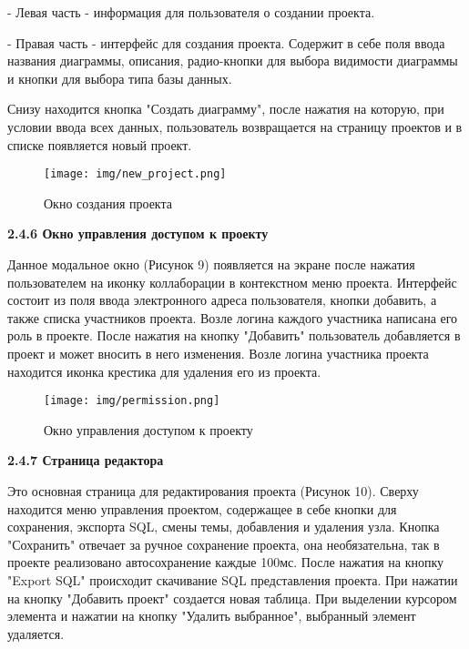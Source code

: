     - Левая часть - информация для пользователя о создании проекта.
    
    - Правая часть - интерфейс для создания проекта. Содержит в себе поля ввода названия диаграммы, описания, радио-кнопки для выбора видимости диаграммы и кнопки для выбора типа базы данных.
    
Снизу находится кнопка "Создать диаграмму", после нажатия на которую, при условии ввода всех данных, пользователь возвращается на страницу проектов и в списке появляется новый проект.

\renewcommand{\figurename}{Рисунок}
\begin{figure}[htbp]
    \centering %
    \texttt{[image: img/new\_project.png]}
    \caption{Окно создания проекта}
    \label{fig:analyze} %
\end{figure}

\newpage

\textbf{\large 2.4.6 Окно управления доступом к проекту}

Данное модальное окно (Рисунок 9) появляется на экране после нажатия пользователем на иконку коллаборации в контекстном меню проекта. Интерфейс состоит из поля ввода электронного адреса пользователя, кнопки добавить, а также списка участников проекта. Возле логина каждого участника написана его роль в проекте. После нажатия на кнопку "Добавить" пользователь добавляется в проект и может вносить в него изменения. Возле логина участника проекта находится иконка крестика для удаления его из проекта.
    
\renewcommand{\figurename}{Рисунок}
\begin{figure}[htbp]
    \centering %
    \texttt{[image: img/permission.png]}
    \caption{Окно управления доступом к проекту}
    \label{fig:analyze} %
\end{figure}

\newpage

\textbf{\large 2.4.7 Страница редактора}

Это основная страница для редактирования проекта (Рисунок 10). Сверху находится меню управления проектом, содержащее в себе кнопки для сохранения, экспорта SQL, смены темы, добавления и удаления узла. Кнопка "Сохранить" отвечает за ручное сохранение проекта, она необязательна, так в проекте реализовано автосохранение каждые 100мс. После нажатия на кнопку "Export SQL" происходит скачивание SQL представления проекта. При нажатии на кнопку "Добавить проект" создается новая таблица. При выделении курсором элемента и нажатии на кнопку "Удалить выбранное", выбранный элемент удаляется.

